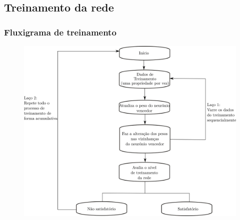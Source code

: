 \documentclass[10pt]{beamer} %
\begin{document}
\subsection{Treinamento da rede}
\begin{frame}
	\frametitle{Fluxigrama de treinamento}
	\begin{scriptsize}
		

	\begin{figure}[H]
		\centering
	
			\includegraphics[scale=0.4]{Imagens/treinamento.png}
	\end{figure}
\end{scriptsize}
\end{frame}
\end{document}
